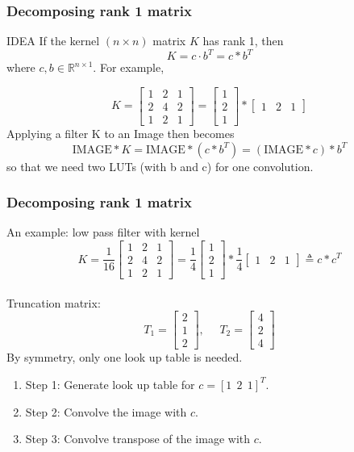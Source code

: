 \documentclass{beamer}
\begin{document}
\begin{frame}
\frametitle{Decomposing rank 1 matrix}

\begin{beamerboxesrounded}[lower=eeks2,upper=eecks,
shadow=true]{IDEA}
If the kernel $(n\times n)$ matrix $K$ has rank 1, then %
$$
K=c\cdot b^T=c*b^T
$$
where $c,b\in \mathbb{R}^{n\times 1}$. For example,
\end{beamerboxesrounded}
$$
K=
\begin{bmatrix}
1 & 2 & 1\\
2 & 4 & 2\\
1 & 2 & 1
\end{bmatrix}
=
\begin{bmatrix}
1 \\
2 \\
1 
\end{bmatrix}
*
\begin{bmatrix}
1 & 2 & 1
\end{bmatrix}
$$
Applying a filter K to an Image then becomes
$$\text{IMAGE}*K=\text{IMAGE}*(c*b^T)=(\text{IMAGE}*c)*b^T
$$
so that we need two LUTs (with b and c) for one convolution.
\end{frame}



\begin{frame}
\frametitle{Decomposing rank 1 matrix}
An example: low pass filter with kernel
$$
K=\frac{1}{16}
\begin{bmatrix}
1 & 2 & 1\\
2 & 4 & 2\\
1 & 2 & 1
\end{bmatrix}
=\frac{1}{4}
\begin{bmatrix}
1 \\
2 \\
1 
\end{bmatrix}
*\frac{1}{4}
\begin{bmatrix}
1 & 2 & 1
\end{bmatrix}
\triangleq c* c^T
$$
\\
Truncation matrix: 
$$
T_1=
\begin{bmatrix}
 2 \\
 1\\
 2
\end{bmatrix}
, \ \ \ \ \ \ 
T_2=
\begin{bmatrix}
 4 \\
 2\\
 4
\end{bmatrix}
$$
By symmetry, only one look up table is needed.
\begin{enumerate}
\item Step 1: Generate look up table for $c=[1\ \  2\ \  1]^T$.
\item Step 2: Convolve the image with $c$. 
\item Step 3: Convolve transpose of the image with $c$. 
\end{enumerate}
\end{frame}
\end{document}
